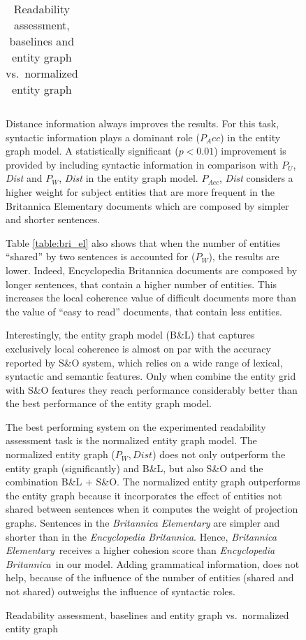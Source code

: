 \begin{figure}[!t]
\begin{table}[!t]
\begin{small}
\begin{tabular}{l|cc@{}l}
\end{tabular}
\end{small}
\caption{Readability assessment, baselines and entity graph vs.\
  normalized entity graph}
\label{table:bri_ele}
\end{table}


Distance information always improves the results. 
For this task, syntactic information plays a dominant role ($P_Acc$) in the entity graph model.
A statistically significant ($p < 0.01$)  improvement is provided by including syntactic information in comparison with $P_U$, \textit{Dist} and $P_W$, \textit{Dist} in the entity graph model.   
$P_{Acc}$, \textit{Dist} considers a higher weight for subject entities that are more frequent in the Britannica Elementary documents which are composed by simpler and shorter sentences.


Table \ref{table:bri_el} also shows that when the number of entities ``shared” by two sentences is accounted for ($P_W$), the results are lower. 
Indeed, Encyclopedia Britannica documents are composed by longer sentences, that contain a higher number of entities. 
This increases the local coherence value of difficult documents more than the value of “easy to read” documents, that contain less entities. 

Interestingly, the entity graph model (B\&L) that captures exclusively local coherence is almost on par with the accuracy reported by S\&O \cite{schwarm05} system, which relies on a wide range of lexical, syntactic and semantic features. 
Only when \newcite{barzilay08} combine the entity grid with S\&O features they reach performance considerably better than the best performance of the entity graph model. 

The best performing system on the experimented readability assessment task is the normalized entity graph model. 
The normalized entity graph ($P_W, Dist$) does not only outperform the entity graph (significantly) and B\&L, but also S\&O and the combination B\&L $+$ S\&O. 
The normalized entity graph outperforms the entity graph because it incorporates the effect of entities not shared between sentences when it computes the weight of projection graphs. 
Sentences in the \emph{Britannica Elementary} are simpler and shorter than in the \emph{Encyclopedia Britannica}.
Hence, \emph{Britannica Elementary}\ receives a higher cohesion score than \emph{Encyclopedia Britannica}\ in our
model. 
Adding grammatical information, does not help, because of the influence of the number of entities (shared and not shared) outweighs the influence of syntactic roles. 


\end{figure}
